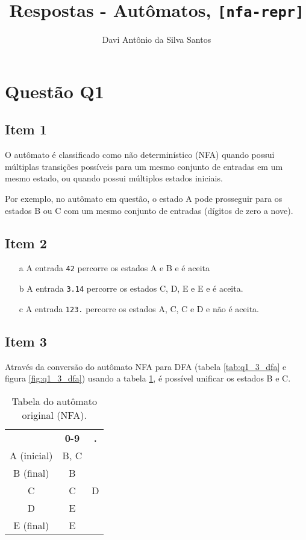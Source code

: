 \documentclass[12pt,a4paper]{article}
\title{Respostas - Autômatos, \texttt{[nfa-repr]}}
\author{Davi Antônio da Silva Santos}
\begin{document}
\section{Questão Q1}
\subsection{Item 1}
O autômato é classificado como não determinístico (NFA) quando possui múltiplas transições possíveis para um mesmo conjunto de entradas em um mesmo estado, ou quando possui múltiplos estados iniciais.

Por exemplo, no autômato em questão, o estado A pode prosseguir para os estados B ou C com um mesmo conjunto de entradas (dígitos de zero a nove).

\subsection{Item 2}
\begin{enumerate}
	\item[a] A entrada \texttt{42} percorre os estados A e B e é aceita
	\item[b] A entrada \texttt{3.14} percorre os estados C, D, E e E e é aceita.
	\item[c] A entrada \texttt{123.} percorre os estados A, C, C e D e não é aceita.
\end{enumerate}

\subsection{Item 3}
Através da conversão do autômato NFA para DFA (tabela \ref{tab:q1_3_dfa} e figura \ref{fig:q1_3_dfa}) usando a tabela \ref{tab:q1_3_nfa}, é possível unificar os estados B e C.

\begin{table}[htb]
\caption[Tabela do autômato original (NFA)]{Tabela do autômato original (NFA).}
\centering
\label{tab:q1_3_nfa}
\begin{tabular}{c|c|c}
    \hline
    & \textbf{0-9} & \textbf{.} \\
    A (inicial) & B, C & \\
    B (final) & B & \\
    C & C & D \\
    D & E & \\
    E (final) & E & \\
    \hline
\end{tabular}
\end{table}
\end{document}
